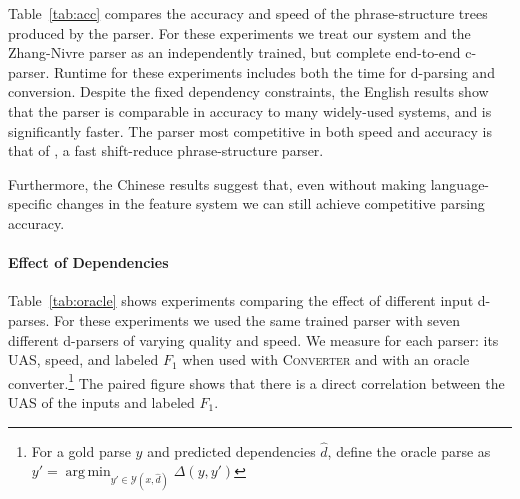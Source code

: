 \documentclass[11pt,letterpaper]{article}
\DeclareMathOperator*{\argmin}{arg\,min}
\newcommand{\ParseName}{\textsc{Converter}\xspace}
\newcommand{\nascomment}[1]{\textcolor{blue}{\bf \small [#1 --nas]}}
\begin{document}
Table~\ref{tab:acc} compares the accuracy and speed of the
phrase-structure trees produced by the parser.  For these experiments
we treat our system and the Zhang-Nivre parser as an independently
trained, but complete end-to-end c-parser. Runtime for these
experiments includes both the time for d-parsing and conversion.
Despite the fixed dependency constraints, the English results show
that the parser is comparable in accuracy to many widely-used systems,
and is significantly faster. The parser most competitive in both speed
and accuracy is that of , a fast shift-reduce
phrase-structure parser.

Furthermore, the Chinese results suggest that, even without making
language-specific changes in the feature system we can still achieve
competitive parsing accuracy.  



\paragraph{Effect of Dependencies}

Table~\ref{tab:oracle} shows experiments comparing the effect of
different input d-parses.  For these experiments we used the same
trained parser with seven different d-parsers of varying quality and
speed. We measure for each parser: its UAS, speed, and labeled $F_1$
when used with \ParseName and with an oracle converter.\footnote{For a
  gold parse $y$ and predicted dependencies $\hat{d}$, define the
  oracle parse as $y' = \argmin_{y' \in \mathcal{Y}(x, \hat{d})}
  \Delta(y, y') $} The paired figure shows that there is a direct
correlation between the UAS of the inputs and labeled $F_1$.

\end{document}
